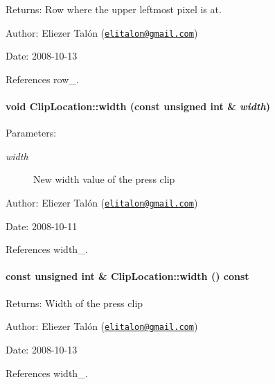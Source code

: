 \begin{Desc}
\item[Returns:]Row where the upper leftmost pixel is at.\end{Desc}
\begin{Desc}
\item[Author:]Eliezer Talón (\href{mailto:elitalon@gmail.com}{\tt elitalon@gmail.com}) \end{Desc}
\begin{Desc}
\item[Date:]2008-10-13 \end{Desc}


References row\_\-.\hypertarget{class_clip_location_7dc15a35acc1594dfc1e5f64ca33d3b9}{
\paragraph[{width}]{\setlength{\rightskip}{0pt plus 5cm}void ClipLocation::width (const unsigned int \& {\em width})}\hfill}
\label{class_clip_location_7dc15a35acc1594dfc1e5f64ca33d3b9}


\begin{Desc}
\item[Parameters:]
\begin{description}
\item[{\em width}]New width value of the press clip\end{description}
\end{Desc}
\begin{Desc}
\item[Author:]Eliezer Talón (\href{mailto:elitalon@gmail.com}{\tt elitalon@gmail.com}) \end{Desc}
\begin{Desc}
\item[Date:]2008-10-11 \end{Desc}


References width\_\-.\hypertarget{class_clip_location_e48a4531c0473ec63dbc992e866a50e7}{
\paragraph[{width}]{\setlength{\rightskip}{0pt plus 5cm}const unsigned int \& ClipLocation::width () const}\hfill}
\label{class_clip_location_e48a4531c0473ec63dbc992e866a50e7}


\begin{Desc}
\item[Returns:]Width of the press clip\end{Desc}
\begin{Desc}
\item[Author:]Eliezer Talón (\href{mailto:elitalon@gmail.com}{\tt elitalon@gmail.com}) \end{Desc}
\begin{Desc}
\item[Date:]2008-10-13 \end{Desc}


References width\_\-.